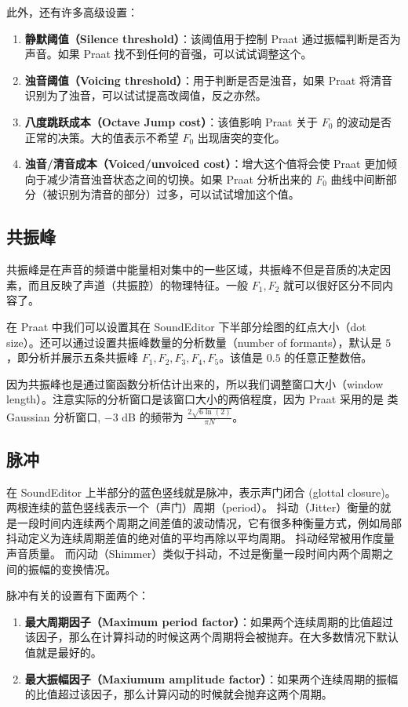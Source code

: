 此外，还有许多高级设置：
\begin{enumerate}
  \item \textbf{静默阈值（Silence threshold）}：该阈值用于控制 Praat 通过振幅判断是否为声音。如果 Praat 找不到任何的音强，可以试试调整这个。
  \item \textbf{浊音阈值（Voicing threshold）}：用于判断是否是浊音，如果 Praat 将清音识别为了浊音，可以试试提高改阈值，反之亦然。
  \item \textbf{八度跳跃成本（Octave Jump cost）}：该值影响 Praat 关于 $F_0$ 的波动是否正常的决策。大的值表示不希望 $F_0$ 出现唐突的变化。
  \item \textbf{浊音/清音成本（Voiced/unvoiced cost）}：增大这个值将会使 Praat 更加倾向于减少清音浊音状态之间的切换。如果 Praat 分析出来的 $F_0$ 曲线中间断部分（被识别为清音的部分）过多，可以试试增加这个值。
\end{enumerate}

\subsection{共振峰}
共振峰是在声音的频谱中能量相对集中的一些区域，共振峰不但是音质的决定因素，而且反映了声道（共振腔）的物理特征。一般 $F_1, F_2$ 就可以很好区分不同内容了。

在 Praat 中我们可以设置其在 SoundEditor 下半部分绘图的红点大小（dot size）。还可以通过设置共振峰数量的分析数量（number of formants），默认是 $5$，即分析并展示五条共振峰 $F_1, F_2, F_3, F_4, F_5$。该值是 $0.5$ 的任意正整数倍。

因为共振峰也是通过窗函数分析估计出来的，所以我们调整窗口大小（window length）。注意实际的分析窗口是该窗口大小的两倍程度，因为 Praat 采用的是 {\kaishu 类 Gaussian 分析窗口}, $-3$ dB 的频带为 $\frac{2 \sqrt{6 \ln(2)}}{\pi N}$。

\subsection{脉冲}
在 SoundEditor 上半部分的蓝色竖线就是脉冲，表示{\kaishu 声门闭合 (glottal closure)}。
两根连续的蓝色竖线表示一个（声门）周期（period）。
{\kaishu 抖动（Jitter）}衡量的就是一段时间内连续两个周期之间差值的波动情况，它有很多种衡量方式，例如局部抖动定义为连续周期差值的绝对值的平均再除以平均周期。
抖动经常被用作度量声音质量。
而闪动（Shimmer）类似于抖动，不过是衡量一段时间内两个周期之间的振幅的变换情况。

脉冲有关的设置有下面两个：

\begin{enumerate}
  \item \textbf{最大周期因子（Maximum period factor）}：如果两个连续周期的比值超过该因子，那么在计算抖动的时候这两个周期将会被抛弃。在大多数情况下默认值就是最好的。
  \item \textbf{最大振幅因子（Maxiumum amplitude factor）}：如果两个连续周期的振幅的比值超过该因子，那么计算闪动的时候就会抛弃这两个周期。
\end{enumerate}

